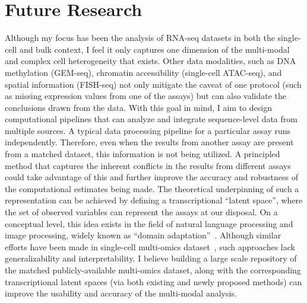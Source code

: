 \documentclass[11pt,a4paper,sans]{moderncv}
\begin{document}
\section{Future Research}
Although my focus has been the analysis of RNA-seq datasets in both the single-cell and bulk context, I feel it only captures one dimension of the multi-modal and complex cell heterogeneity that exists. Other data modalities, such as DNA methylation (GEM-seq), chromatin accessibility (single-cell ATAC-seq), and spatial information (FISH-seq) not only mitigate the caveat of one protocol (such as missing expression values from one of the assays) but can also validate the conclusions drawn from the data.  With this goal in mind, I aim to design computational pipelines that can analyze and integrate sequence-level data from multiple sources.  A typical data processing pipeline for a particular assay runs independently. Therefore, even when the results from another assay are present from a matched dataset, this information is not being utilized. A principled method that captures the inherent conflicts in the results from different assays could take advantage of this and further improve the accuracy and robustness of the computational estimates being made. The theoretical underpinning of such a representation can be achieved by defining a transcriptional ``latent space'', where the set of observed variables can represent the assays at our disposal. On a conceptual level, this idea exists in the field of natural language processing and image processing, widely known as ``domain adaptation''~\cite{daume2009frustratingly,ganin2014unsupervised}. Although similar efforts have been made in single-cell multi-omics dataset~\cite{liu2019jointly,amodio2018magan,eraslan2019deep}, such approaches lack generalizability and interpretability. I believe building a large scale repository of the matched publicly-available multi-omics dataset, along with the corresponding transcriptional latent spaces (via both existing and newly proposed methods) can improve the usability and accuracy of the multi-modal analysis.
\end{document}
